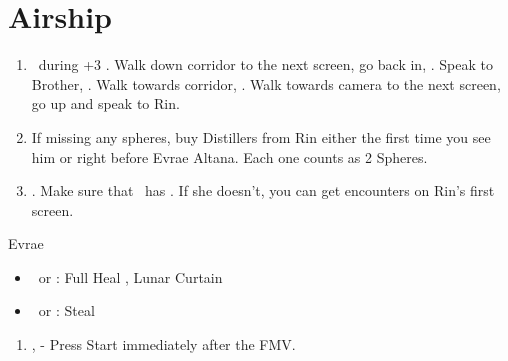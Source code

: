 \chapter{Airship}

\begin{enumerate}
	\item \sd\ during \cs+3 \skippablefmv. Walk down corridor to the next screen, go back in, \sd. Speak to Brother, \sd. Walk towards corridor, \sd. Walk towards camera to the next screen, go up and speak to Rin.
	\item If missing any spheres, buy Distillers from Rin either the first time you see him or right before Evrae Altana. Each one counts as 2 Spheres.
	\item \save. Make sure that \rikku\ has \od. If she doesn't, you can get encounters on Rin's first screen.
\end{enumerate}
\begin{battle}[32000]{Evrae}
	\begin{itemize}
		\tidusf Haste \tidus
		\tidusf Cheer x2
		\tidusf Equip Baroque Sword
		\tidusf Attack x6
		\rikkuf \od\ Mix Luck Sphere + Map
		\item \kimahri\ or \rikku: Full Heal \tidus, Lunar Curtain \tidus
		\item \kimahri\ or \rikku: Steal
	\end{itemize}
\end{battle}
\begin{enumerate}[resume]
	\item \sd, \skippablefmv[3:00] - Press Start immediately after the FMV.
\end{enumerate}